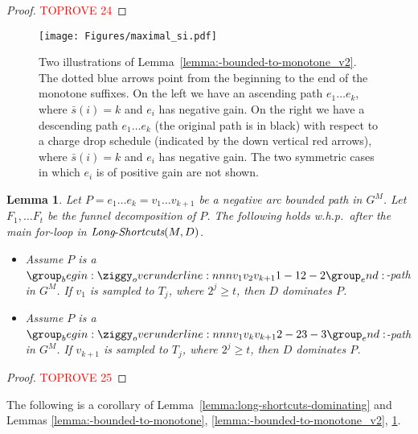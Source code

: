 \documentclass[11pt]{article}
\newtheorem{lemma}[theorem]{Lemma}
\newcommand{\LS}{\mbox{{\it Long}-{\it Shortcuts}}}
\begin{document}
\begin{proof}\textcolor{red}{TOPROVE 24}\end{proof}



\begin{figure}
    \centering
\texttt{[image: Figures/maximal\_si.pdf]}
\caption{Two illustrations of Lemma~\ref{lemma:-bounded-to-monotone_v2}. The dotted blue arrows point from the beginning to the end of the monotone suffixes. On the left we have an ascending path $e_1 \ldots e_k$, where $\bar{s}(i)=k$ and $e_i$ has negative gain. On the right we have a descending path $e_1\ldots e_k$ (the original path is in black) with respect to a charge drop schedule (indicated by the down vertical red arrows), where $\bar{s}(i)=k$ and $e_i$ has negative gain. The two symmetric cases in which $e_i$ is of positive gain are not shown.}
\label{fig:maximal_si}
\end{figure}


\begin{lemma}\label{lemma:funnel-bfs-length}
    Let $P=e_1 \ldots e_k = v_1\ldots v_{k+1}$ be a negative arc bounded path in $G^M$. Let $F_1, \ldots F_t$ be the funnel decomposition of $P$. The following holds w.h.p.\ after the main for-loop in $\LS(M,D)$.
    \begin{itemize}
        \item Assume $P$ is a $\overunderline{{v_1}{v_2}{v_{k+1}}}{1-1}{2-2}$-path in $G^M$. If $v_1$ is sampled to $T_j$, where $2^j\ge t$, then $D$ dominates $P$.
        \item Assume $P$ is a $\overunderline{{v_1}{v_{k}}{v_{k+1}}}{2-2}{3-3}$-path in $G^M$. If $v_{k+1}$ is sampled to $T_j$, where $2^j\ge t$, then $D$ dominates $P$.
    \end{itemize}
\end{lemma}

\begin{proof}\textcolor{red}{TOPROVE 25}\end{proof}

The following is a corollary of Lemma~\ref{lemma:long-shortcuts-dominating} and Lemmas \ref{lemma:-bounded-to-monotone}, \ref{lemma:-bounded-to-monotone_v2}, \ref{lemma:funnel-bfs-length}.
\end{document}
